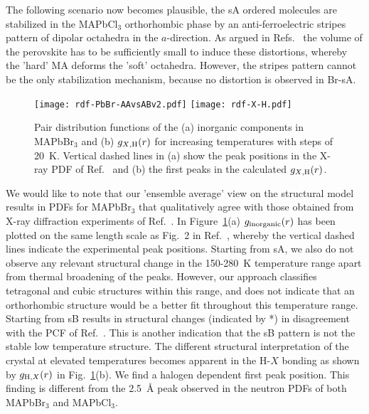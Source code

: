 \documentclass[journal=jpccck,manuscript=article,layout=twocolumn]{achemso}
\begin{document}
The following scenario now becomes plausible, the sA ordered molecules are stabilized in the MAPbCl$_3$ orthorhombic phase by an anti-ferroelectric stripes pattern of dipolar octahedra in the $a$-direction. As argued in Refs.~\cite{Chi:jssc05} the volume of the perovskite has to be sufficiently small to induce these distortions, whereby the 'hard' MA deforms the 'soft' octahedra. However, the stripes pattern cannot be the only stabilization mechanism, because no distortion is observed in Br-sA.\newline{}


\begin{figure}[!t]
    \begin{center}
    \texttt{[image: rdf-PbBr-AAvsABv2.pdf]}
    \texttt{[image: rdf-X-H.pdf]}
    \end{center}
   \caption{Pair distribution functions of the (a) inorganic components in MAPbBr$_3$ and (b) $g_{X{\rm ,H}}(r)$ for increasing temperatures with steps of 20~K. Vertical dashed lines in (a) show the peak positions in the X-ray PDF of Ref.~\cite{Bernasconi:acsenl17} and (b) the first peaks in the calculated $g_{X{\rm ,H}}(r)$.}
\label{fig:rdf}
\end{figure}

We would like to note that our 'ensemble average' view on the structural model results in PDFs for MAPbBr$_3$ that qualitatively agree with those obtained from X-ray diffraction experiments of Ref.~\cite{Bernasconi:acsenl17}. In Figure~\ref{fig:rdf}(a) $g_{\rm inorganic}(r)$ has been plotted on the same length scale as Fig.~2 in Ref.~\cite{Bernasconi:acsenl17}, whereby the vertical dashed lines indicate the experimental peak positions. Starting from sA, we also do not observe any relevant structural change in the 150-280~K temperature range apart from thermal broadening of the peaks. However, our approach classifies tetragonal and cubic structures within this range, and does not indicate that an orthorhombic structure would be a better fit throughout this temperature range. Starting from sB results in structural changes (indicated by *) in disagreement with the PCF of Ref.~\cite{Bernasconi:acsenl17}. This is another indication that the sB pattern is not the stable low temperature structure. The different structural interpretation of the crystal at elevated temperatures becomes apparent in the H-$X$ bonding as shown by $g_{{\rm H},X}(r)$ in Fig.~\ref{fig:rdf}(b). We find a halogen dependent first peak position. This finding is different from the 2.5~\AA{} peak observed in the neutron PDFs of both MAPbBr$_3$ and MAPbCl$_3$\cite{Bernasconi:jpcc18}.
\newline{}
\end{document}
